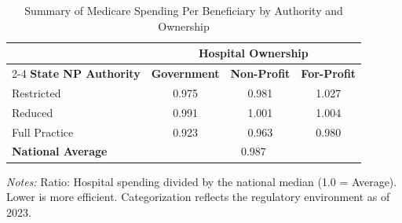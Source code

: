 \begin{table}[htbp]
    \centering
    \caption{Summary of Medicare Spending Per Beneficiary by Authority and Ownership}
    \label{tab:mspb_score_own}
    \vspace{0.2cm}
    \begin{tabular}{lccc}
        \toprule
        & \multicolumn{3}{c}{\textbf{Hospital Ownership}} \\
        \cmidrule(lr){2-4}
        \textbf{State NP Authority} & \textbf{Government} & \textbf{Non-Profit} & \textbf{For-Profit} \\
        \midrule
        Restricted & 0.975 & 0.981 & 1.027 \\
        Reduced & 0.991 & 1.001 & 1.004 \\
        Full Practice & 0.923 & 0.963 & 0.980 \\
        \midrule
        \textbf{National Average} & \multicolumn{3}{c}{0.987} \\
        \bottomrule
    \end{tabular}
    \vspace{0.1cm}
    \begin{minipage}{0.85\textwidth}
        \footnotesize \textit{Notes:} Ratio: Hospital spending divided by the national median (1.0 = Average). Lower is more efficient. Categorization reflects the regulatory environment as of 2023.
    \end{minipage}
\end{table}